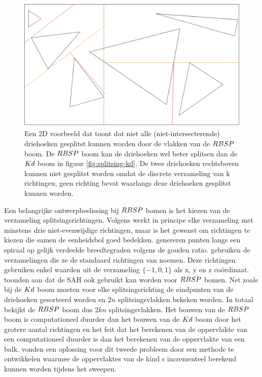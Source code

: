     \begin{figure}
        \centering
        \includegraphics[width=\linewidth]{img/splitsing-RBSP}
        \caption{Een 2D voorbeeld dat toont dat niet alle (niet-intersecterende) driehoeken gesplitst kunnen worden door de vlakken van de $RBSP$ boom. De $RBSP$ boom kan de driehoeken wel beter splitsen dan de $Kd$ boom in figuur \ref{fig:splitsing-kd}. De twee driehoeken rechtsboven kunnen niet gesplitst worden omdat de discrete verzameling van k richtingen, geen richting bevat waarlangs deze driehoeken gesplitst kunnen worden.}
        \label{fig:splitsing-rbsp}    
    \end{figure}

    Een belangrijke ontwerpbeslissing bij $RBSP$ bomen is het kiezen van de verzameling splitsingsrichtingen. 
    Volgens \authorBudge{} \cite{Budge} werkt in principe elke verzameling met minstens drie niet-evenwijdige richtingen, maar is het gewenst om richtingen te kiezen die samen de eenheidsbol goed bedekken.
    \authorKammaje{} \cite{Kammaje} genereren punten langs een spiraal op gelijk verdeelde breedtegraden volgens de gouden ratio.
    \authorBudge{} \cite{Budge} gebruiken de verzamelingen die ze de standaard richtingen van \authorKlosowki{} \cite{klosowski1998efficient} noemen.
    Deze richtingen gebruiken enkel waarden uit de verzameling $\{-1, 0, 1\}$ als x, y en z coördinaat. %
    \\

    \authorKammaje{} \cite{Kammaje} toonden aan dat de SAH ook gebruikt kan worden voor $RBSP$ bomen. Net zoals bij de $Kd$ boom moeten voor elke splitsingsrichting de eindpunten van de driehoeken gesorteerd worden en $2n$ splitsingsvlakken bekeken worden. In totaal bekijkt de $RBSP$ boom dus $2kn$ splitsingsvlakken. Het bouwen van de $RBSP$ boom is computationeel duurder dan het bouwen van de $Kd$ boom door het grotere aantal richtingen en het feit dat het berekenen van de oppervlakte van een \symKDOP{} computationeel duurder is dan het berekenen van de oppervlakte van een balk. \authorBudge{} \cite{Budge} vonden een oplossing voor dit tweede probleem door een methode te ontwikkelen waarmee de oppervlaktes van de kind \symKDOP s incrementeel berekend kunnen worden tijdens het sweepen.\\

